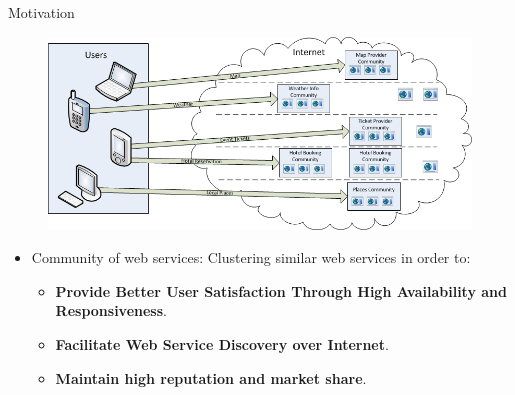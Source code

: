 \documentclass{beamer}
\begin{document}
\begin{frame}{Motivation}
    \begin{figure}[htbp]
        \centering
        \includegraphics[width=0.9 \columnwidth]{figures/wsinternet2.png}
    \end{figure}

    \begin{itemize}
        \item Community of web services: Clustering similar web services in order to:
        \begin{itemize}
            \item \textbf{Provide Better User Satisfaction Through High Availability and Responsiveness}.
            \item \textbf{Facilitate Web Service Discovery over Internet}.
            \item \textbf{Maintain high reputation and market share}.
        \end{itemize}
    \end{itemize}
\end{frame}
\end{document}
